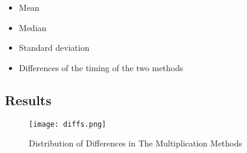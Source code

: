\documentclass[usletter, 12pt]{article}
\begin{document}
        \begin{itemize}

            \item Mean
            \item Median
            \item Standard deviation
            \item Differences of the timing of the two methods

        \end{itemize}

        \subsection{Results}
        \begin{figure}[ht]
            \begin{center}
                \texttt{[image: diffs.png]}
                \caption{Distribution of Differences in The Multiplication Methods} \label{diffs}
            \end{center}
        \end{figure}
\end{document}
